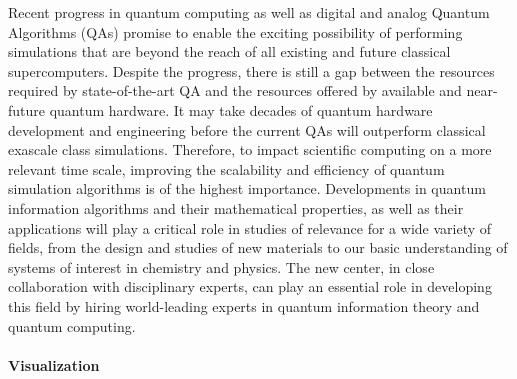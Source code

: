 \documentclass[a4paper,10pt]{article}
\begin{document}
Recent progress in quantum computing as well as digital and analog Quantum Algorithms (QAs) promise to enable the exciting possibility of performing simulations that are beyond the reach of all existing and future classical supercomputers. Despite the progress, there is still a gap between the resources required by state-of-the-art QA and the resources offered by available and near-future quantum hardware. It may take decades of quantum hardware development and engineering before the current QAs will outperform classical exascale class simulations. Therefore, to impact scientific computing on a more relevant time scale, improving the scalability and efficiency of quantum simulation algorithms is of the highest importance. Developments in quantum information algorithms and their mathematical properties, as well as their applications will play a critical role in studies of relevance for a wide variety of fields, from the design and studies of new materials to our basic understanding of systems of interest in chemistry and physics. The new center, in close collaboration with disciplinary experts, can play an essential role in developing this field by hiring world-leading experts in quantum information theory and quantum computing.

\paragraph{Visualization}
\end{document}
